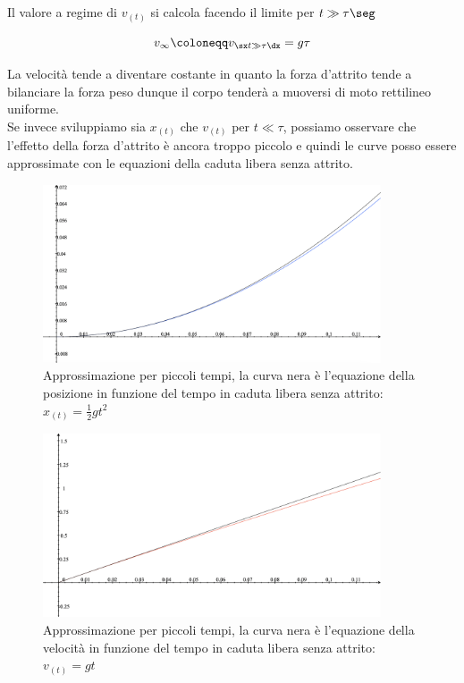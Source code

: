 Il valore a regime di $v_{(t)}$ si calcola facendo il limite per $t\gg\tau\seg$

\begin{equation}
v_\infty\coloneqq v_{\sx t\gg\tau \dx} = g\tau
\end{equation}

La velocità tende a diventare costante in quanto la forza d'attrito tende a bilanciare la forza peso dunque il corpo tenderà a muoversi di moto rettilineo uniforme.\\
Se invece sviluppiamo sia $x_{(t)}$ che $v_{(t)}$ per $t\ll\tau$, possiamo osservare che l'effetto della forza d'attrito è ancora troppo piccolo e quindi le curve posso essere approssimate con le equazioni della caduta libera senza attrito.

\begin{figure}[htbp]
\begin{center}
\includegraphics[width=10cm]{images/cadsmorzx.png}
\caption{Approssimazione per piccoli tempi, la curva nera è l'equazione della posizione in funzione del tempo in caduta libera senza attrito: $x_{(t)} = \frac12gt^2$}
\label{default}
\end{center}
\end{figure}

\begin{figure}[htbp]
\begin{center}
\includegraphics[width=10cm]{images/cadsmorzv.png}
\caption{Approssimazione per piccoli tempi, la curva nera è l'equazione della velocità in funzione del tempo in caduta libera senza attrito: $v_{(t)} = gt$}
\label{default}
\end{center}
\end{figure}

